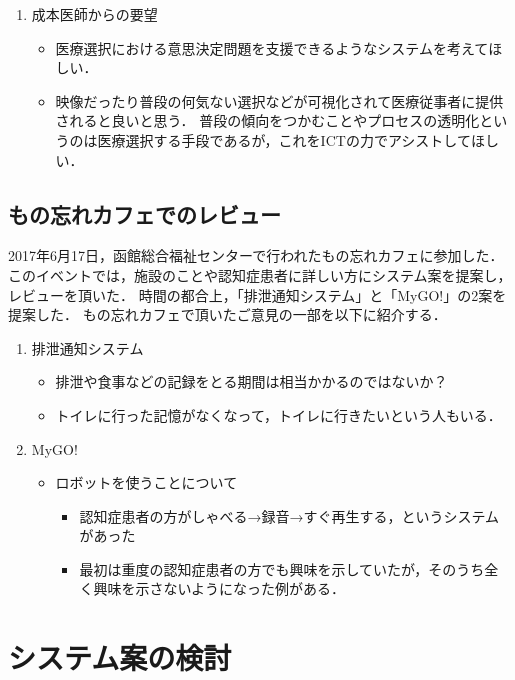\documentclass[../report]{subfiles}
\begin{document}
\begin{enumerate}
    \item[] 成本医師からの要望
\begin{itemize}
    \item 医療選択における意思決定問題を支援できるようなシステムを考えてほしい．
    \item 映像だったり普段の何気ない選択などが可視化されて医療従事者に提供されると良いと思う．
普段の傾向をつかむことやプロセスの透明化というのは医療選択する手段であるが，これをICTの力でアシストしてほしい．
\end{itemize}
\end{enumerate}

\subsection{もの忘れカフェでのレビュー} \label{sec:4_hyouka_monowasurecafe}
2017年6月17日，函館総合福祉センターで行われたもの忘れカフェに参加した．
このイベントでは，施設のことや認知症患者に詳しい方にシステム案を提案し，レビューを頂いた．
時間の都合上，「排泄通知システム」と「MyGO!」の2案を提案した．
もの忘れカフェで頂いたご意見の一部を以下に紹介する．

\begin{enumerate}
    \item[] 排泄通知システム
\begin{itemize}
    \item 排泄や食事などの記録をとる期間は相当かかるのではないか？
    \item トイレに行った記憶がなくなって，トイレに行きたいという人もいる．
\end{itemize}

    \item[] MyGO!
\begin{itemize}
    \item ロボットを使うことについて
	\begin{itemize}
		\item 認知症患者の方がしゃべる→録音→すぐ再生する，というシステムがあった
		\item 最初は重度の認知症患者の方でも興味を示していたが，そのうち全く興味を示さないようになった例がある．
	\end{itemize}
\end{itemize}
\end{enumerate}

\section{システム案の検討}
\end{document}
